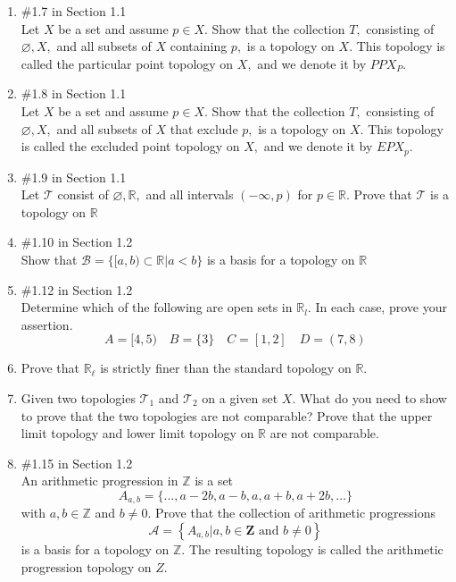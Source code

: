 \documentclass[12pt]{article}
\newcommand{\R}{\mathbb{R}}
\newcommand{\TT}{\mathcal{T}}
\begin{document}
\begin{enumerate}
\item \#1.7 in Section 1.1\\
Let $X$ be a set and assume $p \in X .$ Show that the collection $T,$ consisting of
$\varnothing, X,$ and all subsets of $X$ containing $p,$ is a topology on $X .$ This topology is called the particular point topology on $X,$ and we denote it by $P P X_{P} .$
\item \#1.8 in Section 1.1\\
Let $X$ be a set and assume $p \in X .$ Show that the collection $T,$ consisting of
$\varnothing, X,$ and all subsets of $X$ that exclude $p,$ is a topology on $X .$ This topology is called the excluded point topology on $X,$ and we denote it by $E P X_{p}$.
\item \#1.9 in Section 1.1\\
Let $\mathcal{T}$ consist of $\varnothing, \mathbb{R},$ and all intervals $(-\infty, p)$ for $p \in \mathbb{R} .$ Prove that $\mathcal{T}$ is a topology on $\mathbb{R}$
\item \#1.10 in Section 1.2\\
Show that $\mathcal{B}=\{[a, b) \subset \mathbb{R} | a<b\}$ is a basis for a topology on $\mathbb{R}$
\item \#1.12 in Section 1.2\\
Determine which of the following are open sets in $\mathbb{R}_{l} .$ In each case, prove your assertion.
$$
A=[4,5) \quad B=\{3\} \quad C=[1,2] \quad D=(7,8)
$$

\item Prove that $\R_\ell$ is strictly finer than the standard topology on $\R$.

\item Given two topologies $\TT_1$ and $\TT_2$ on a given set $X$. What do you need to show to prove that the two topologies are not comparable? Prove that the upper limit topology and lower limit topology on $\R$ are not comparable. 

\item \#1.15 in Section 1.2\\
An arithmetic progression in $\mathbb{Z}$ is a set
$$
A_{a, b}=\{\ldots, a-2 b, a-b, a, a+b, a+2 b, \ldots\}
$$
with $a, b \in \mathbb{Z}$ and $b \neq 0 .$ Prove that the collection of arithmetic progressions
$$
\mathcal{A}=\left\{A_{a, b} | a, b \in \mathbf{Z} \text { and } b \neq 0\right\}
$$
is a basis for a topology on $\mathbb{Z}$. The resulting topology is called the arithmetic progression topology on $Z .$


\end{enumerate}
\end{document}
